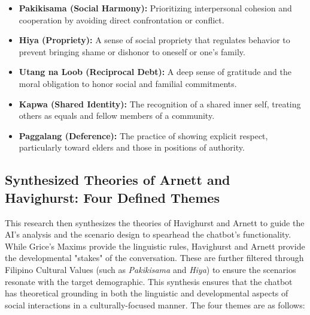 \begin{itemize}
\item \textbf{Pakikisama (Social Harmony):} Prioritizing interpersonal cohesion and cooperation by avoiding direct confrontation or conflict.
\item \textbf{Hiya (Propriety):} A sense of social propriety that regulates behavior to prevent bringing shame or dishonor to oneself or one's family.
\item \textbf{Utang na Loob (Reciprocal Debt):} A deep sense of gratitude and the moral obligation to honor social and familial commitments.
\item \textbf{Kapwa (Shared Identity):} The recognition of a shared inner self, treating others as equals and fellow members of a community.
\item \textbf{Paggalang (Deference):} The practice of showing explicit respect, particularly toward elders and those in positions of authority.
\end{itemize}

\subsection{Synthesized Theories of Arnett and Havighurst: Four Defined Themes}
This research then synthesizes the theories of Havighurst and Arnett to guide the AI's analysis and the scenario design to spearhead the chatbot's functionality. While Grice’s
Maxims provide the linguistic rules, Havighurst and Arnett provide the developmental "stakes" of the conversation. These are further filtered through Filipino Cultural Values 
(such as \textit{Pakikisama} and \textit{Hiya}) to ensure the scenarios resonate with the target demographic. This synthesis ensures that the chatbot has theoretical grounding
in both the linguistic and developmental aspects of social interactions in a culturally-focused manner. The four themes are as follows:

